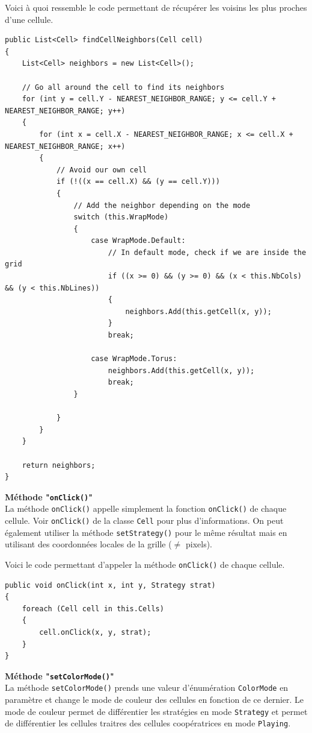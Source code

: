 \documentclass[a4paper, french]{article}
\begin{document}
Voici à quoi ressemble le code permettant de récupérer les voisins les plus proches d'une cellule.
\begin{lstlisting}
public List<Cell> findCellNeighbors(Cell cell)
{
    List<Cell> neighbors = new List<Cell>();

    // Go all around the cell to find its neighbors
    for (int y = cell.Y - NEAREST_NEIGHBOR_RANGE; y <= cell.Y + NEAREST_NEIGHBOR_RANGE; y++)
    {
        for (int x = cell.X - NEAREST_NEIGHBOR_RANGE; x <= cell.X + NEAREST_NEIGHBOR_RANGE; x++)
        {
            // Avoid our own cell
            if (!((x == cell.X) && (y == cell.Y)))
            {
                // Add the neighbor depending on the mode
                switch (this.WrapMode)
                {
                    case WrapMode.Default:
                        // In default mode, check if we are inside the grid
                        if ((x >= 0) && (y >= 0) && (x < this.NbCols) && (y < this.NbLines))
                        {
                            neighbors.Add(this.getCell(x, y));
                        }
                        break;

                    case WrapMode.Torus:
                        neighbors.Add(this.getCell(x, y));
                        break;
                }

            }
        }
    }

    return neighbors;
}
\end{lstlisting}

\pagebreak
\textbf{Méthode "\texttt{onClick()}"}\\
La méthode \texttt{onClick()} appelle simplement la fonction \texttt{onClick()} de chaque cellule. Voir \texttt{onClick()} de la classe \texttt{Cell} pour plus d'informations. On peut également utiliser la méthode \texttt{setStrategy()} pour le même résultat mais en utilisant des coordonnées locales de la grille ($\neq$ pixels).

Voici le code permettant d'appeler la méthode \texttt{onClick()} de chaque cellule.
\begin{lstlisting}
public void onClick(int x, int y, Strategy strat)
{
    foreach (Cell cell in this.Cells)
    {
        cell.onClick(x, y, strat);
    }
}
\end{lstlisting}


\textbf{Méthode "\texttt{setColorMode()}"}\\
La méthode \texttt{setColorMode()} prends une valeur d'énumération \texttt{ColorMode} en paramètre et change le mode de couleur des cellules en fonction de ce dernier. Le mode de couleur permet de différentier les stratégies en mode \texttt{Strategy} et permet de différentier les cellules traitres des cellules coopératrices en mode \texttt{Playing}.
\end{document}
